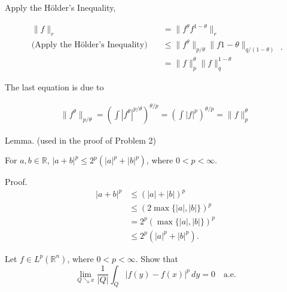 \documentclass[UTF8,a4paper,10pt]{article}
\begin{document}
\begin{solution}
Apply the Hölder’s Inequality,

\begin{equation*}
  \begin{aligned}
    \| f \|_r &= \| f^{\theta} f^{1-\theta} \|_r \\ \text{(Apply the Hölder’s Inequality)}\quad
    &\leq \| f^\theta \|_{p/\theta} \| f1-\theta \|_{q/(1-\theta)}\\
     &=\| f \|_p^\theta \| f \|_q^{1-\theta}
  \end{aligned}.
\end{equation*}

The last equation is due to

\begin{equation*}
  \begin{aligned}
    \| f^{\theta} \|_{p/\theta} =  \left( \int |f^{\theta}|^{p/\theta} \right)^{\theta/p} = \left( \int |f|^{p} \right)^{\theta/p} = \| f \|_{p}^{\theta}
  \end{aligned}
\end{equation*}


  
\end{solution}



\begin{mybox}{}
  Lemma. (used in the proof of Problem 2)
  
   For \(a, b \in \mathbb{R}\), \(|a + b|^p \leq 2^p(|a|^p + |b|^p)\), where \(0 < p < \infty\).
  
  Proof.
  \begin{equation*}
  \begin{aligned}
  |a + b|^p &\leq (|a| + |b|)^p \\
  &\leq (2 \max\{|a|, |b|\})^p \\
  &= 2^p (\max\{|a|, |b|\})^p \\
  &\leq 2^p (|a|^p + |b|^p).
  \end{aligned}
  \end{equation*}
  
  \end{mybox}

\pagebreak


\begin{Problem}[]{}

    Let $f \in L^p(\mathbb{R}^n)$, where $0 < p < \infty$. Show that
\[
\lim_{Q \searrow x} \frac{1}{|Q|} \int_Q |f(y) - f(x)|^p \, dy = 0 \quad \text{a.e.}
\]

\end{Problem}
\end{document}
